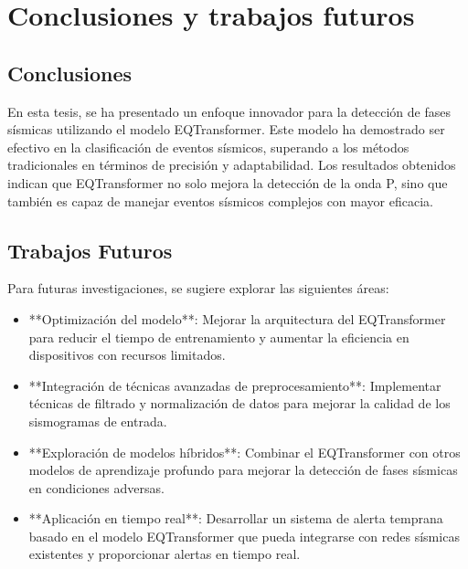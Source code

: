 \chapter{Conclusiones y trabajos futuros}\label{conclusions}

\section{Conclusiones}
En esta tesis, se ha presentado un enfoque innovador para la detección de fases sísmicas utilizando el modelo EQTransformer. Este modelo ha demostrado ser efectivo en la clasificación de eventos sísmicos, superando a los métodos tradicionales en términos de precisión y adaptabilidad. Los resultados obtenidos indican que EQTransformer no solo mejora la detección de la onda P, sino que también es capaz de manejar eventos sísmicos complejos con mayor eficacia.

\section{Trabajos Futuros}
Para futuras investigaciones, se sugiere explorar las siguientes áreas:
\begin{itemize}
    \item **Optimización del modelo**: Mejorar la arquitectura del EQTransformer para reducir el tiempo de entrenamiento y aumentar la eficiencia en dispositivos con recursos limitados.
    \item **Integración de técnicas avanzadas de preprocesamiento**: Implementar técnicas de filtrado y normalización de datos para mejorar la calidad de los sismogramas de entrada.
    \item **Exploración de modelos híbridos**: Combinar el EQTransformer con otros modelos de aprendizaje profundo para mejorar la detección de fases sísmicas en condiciones adversas.
    \item **Aplicación en tiempo real**: Desarrollar un sistema de alerta temprana basado en el modelo EQTransformer que pueda integrarse con redes sísmicas existentes y proporcionar alertas en tiempo real.
\end{itemize}
